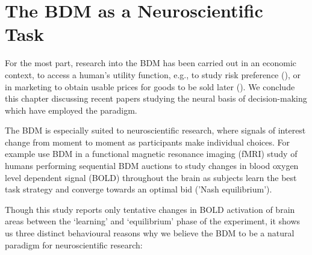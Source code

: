 \clearpage
\section{The BDM as a Neuroscientific Task}

For the most part, research into the BDM has been carried out in an economic context, to access a human's utility function, e.g., to study risk preference (\cite{safraBeckerDeGrootMarschakMechanismNonexpected1990}), or in marketing to obtain usable prices for goods to be sold later (\cite{bohmElicitingReservationPrices1997}). We conclude this chapter discussing recent papers studying the neural basis of decision-making which have employed the paradigm.

The BDM is especially suited to neuroscientific research, where signals of interest change from moment to moment as participants make individual choices. For example \cite{gretherMentalProcessesStrategic2007} use BDM in a functional magnetic resonance imaging (fMRI) study of humans performing sequential BDM auctions to study changes in blood oxygen level dependent signal (BOLD) throughout the brain as subjects learn the best task strategy and converge towards an optimal bid ('Nash equilibrium').

Though this study reports only tentative changes in BOLD activation of brain areas between the ‘learning’ and ‘equilibrium’ phase of the experiment, it shows us three distinct behavioural reasons why we believe the BDM to be a natural paradigm for neuroscientific research:

